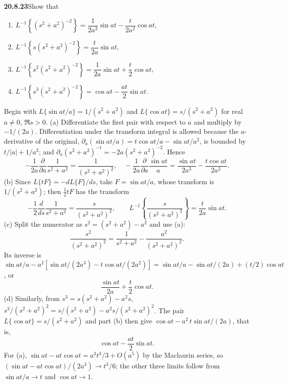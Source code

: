 \par\bigskip
\noindent\textbf{20.8.23}\quad Show that
\begin{enumerate}
\item[(a)] $L^{-1}\left\{(s^{2}+a^{2})^{-2}\right\}
=\dfrac{1}{2a^{3}}\sin at-\dfrac{t}{2a^{2}}\cos at$,
\item[(b)] $L^{-1}\left\{s(s^{2}+a^{2})^{-2}\right\}
=\dfrac{t}{2a}\sin at$,
\item[(c)] $L^{-1}\left\{s^{2}(s^{2}+a^{2})^{-2}\right\}
=\dfrac{1}{2a}\sin at+\dfrac{t}{2}\cos at$,
\item[(d)] $L^{-1}\left\{s^{3}(s^{2}+a^{2})^{-2}\right\}
=\cos at-\dfrac{at}{2}\sin at$.
\end{enumerate}
\par{}
\solution
Begin with
$L\{\sin at/a\}=1/(s^2+a^2)$ and
$L\{\cos at\}=s/(s^2+a^2)$ for real $a\ne0$, $\Re s>0$.
(a) Differentiate the first pair with respect to $a$ and
multiply by $-1/(2a)$. Differentiation under the transform
integral is allowed because the $a$-derivative of the
original,
$\partial_a(\sin at/a)=t\cos at/a-\sin at/a^2$, is bounded by
$t/|a|+1/a^2$; and
$\partial_a(s^2+a^2)^{-1}=-2a(s^2+a^2)^{-2}$. Hence
\[
-\frac1{2a}\frac\partial{\partial a}\frac1{s^2+a^2}
=\frac1{(s^2+a^2)^2},\quad
-\frac1{2a}\frac\partial{\partial a}\frac{\sin at}{a}
=\boxed{\frac{\sin at}{2a^3}-\frac{t\cos at}{2a^2}}.
\]
(b) Since $L\{tF\}=-dL\{F\}/ds$, take $F=\sin at/a$, whose
transform is $1/(s^2+a^2)$; then $\frac12tF$ has the transform
\[
-\frac12\frac d{ds}\frac1{s^2+a^2}
=\frac{s}{(s^2+a^2)^2},
\qquad
\boxed{L^{-1}\left\{\frac{s}{(s^2+a^2)^2}\right\}
=\frac t{2a}\sin at}.
\]
(c) Split the numerator as $s^2=(s^2+a^2)-a^2$ and use (a):
\[
\frac{s^2}{(s^2+a^2)^2}
=\frac1{s^2+a^2}-\frac{a^2}{(s^2+a^2)^2}.
\]
Its inverse is
$\sin at/a-a^2[\sin at/(2a^3)-t\cos at/(2a^2)]
=\sin at/a-\sin at/(2a)+(t/2)\cos at$, or
\[
\boxed{\frac{\sin at}{2a}+\frac t2\cos at}.
\]
(d) Similarly, from $s^3=s(s^2+a^2)-a^2s$,
$s^3/(s^2+a^2)^2=s/(s^2+a^2)-a^2s/(s^2+a^2)^2$.
The pair $L\{\cos at\}=s/(s^2+a^2)$ and part (b) then give
$\cos at-a^2\,t\sin at/(2a)$, that is,
\[
\boxed{\cos at-\frac{at}{2}\sin at}.
\]
For (a), $\sin at-at\cos at=a^3t^3/3+O(a^5)$ by the Maclaurin
series, so $(\sin at-at\cos at)/(2a^3)\to t^3/6$; the other
three limits follow from $\sin at/a\to t$ and $\cos at\to1$.


